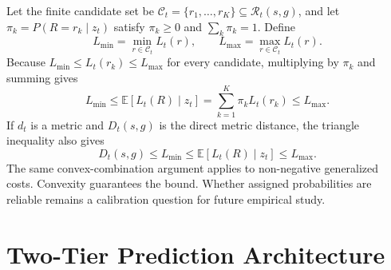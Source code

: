 \documentclass[11pt,letterpaper]{article}
\newcommand{\Rcal}{\mathcal{R}}
\newcommand{\Ccal}{\mathcal{C}}
\begin{document}
Let the finite candidate set be $\Ccal_t=\{r_1,\ldots,r_K\}\subseteq\Rcal_t(s,g)$, and let $\pi_k=P(R=r_k\mid z_t)$ satisfy $\pi_k\geq0$ and $\sum_k\pi_k=1$. Define
\begin{equation}
L_{\min}=\min_{r\in\Ccal_t}L_t(r), \qquad
L_{\max}=\max_{r\in\Ccal_t}L_t(r).
\end{equation}
Because $L_{\min}\leq L_t(r_k)\leq L_{\max}$ for every candidate, multiplying by $\pi_k$ and summing gives
\begin{equation}
L_{\min}\leq \mathbb{E}[L_t(R)\mid z_t]
=\sum_{k=1}^{K}\pi_kL_t(r_k)\leq L_{\max}.
\end{equation}
If $d_t$ is a metric and $D_t(s,g)$ is the direct metric distance, the triangle inequality also gives
\begin{equation}
D_t(s,g)\leq L_{\min}\leq \mathbb{E}[L_t(R)\mid z_t]\leq L_{\max}.
\end{equation}
The same convex-combination argument applies to non-negative generalized costs. Convexity guarantees the bound. Whether assigned probabilities are reliable remains a calibration question for future empirical study.

\section{Two-Tier Prediction Architecture}
\end{document}
